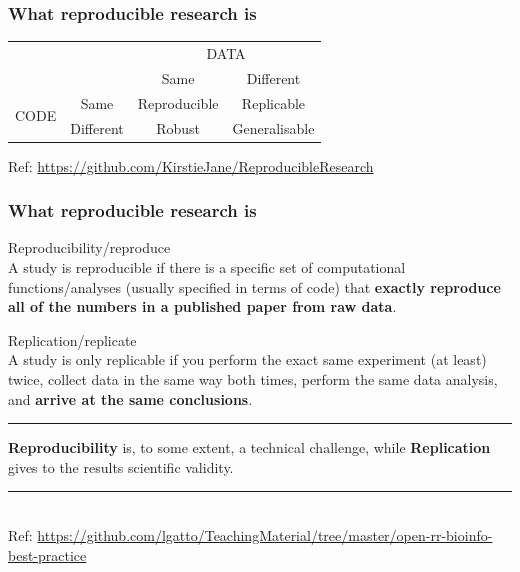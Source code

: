 \documentclass{beamer}
\begin{document}

\begin{frame}
\frametitle{What reproducible research is}
\begin{table}[]
\centering
\begin{tabular}{cccc}
                                           &                                & \multicolumn{2}{c}{DATA}                          \\ \cline{3-4}
                                           & \multicolumn{1}{c|}{}          & Same         & \multicolumn{1}{c|}{Different}     \\ \cline{2-4}
\multicolumn{1}{c|}{\multirow{2}{*}{CODE}} & \multicolumn{1}{c|}{Same}      & Reproducible & \multicolumn{1}{c|}{Replicable}    \\
\multicolumn{1}{c|}{}                      & \multicolumn{1}{c|}{Different} & Robust       & \multicolumn{1}{c|}{Generalisable} \\ \cline{2-4}
\end{tabular}
\end{table}
\vspace{3px}
\tiny Ref: {\url{https://github.com/KirstieJane/ReproducibleResearch}}
\end{frame}


\begin{frame}
\frametitle{What reproducible research is}

\Large{Reproducibility/reproduce}\\ \footnotesize A study is reproducible if there is a specific set of computational functions/analyses (usually specified in terms of code) that \textbf{exactly reproduce all of the numbers in a published paper from raw data}.

\Large{Replication/replicate}\\ \footnotesize A study is only replicable if you perform the exact same experiment (at least) twice, collect data in the same way both times, perform the same data analysis, and \textbf{arrive at the same conclusions}.
\rule{\textwidth}{0.05pt}
{\bf Reproducibility} is, to some extent, a technical challenge, while {\bf Replication} gives to the results scientific validity.
\rule{\textwidth}{0.05pt}\\
\vspace{3px}
\tiny Ref: {\url{https://github.com/lgatto/TeachingMaterial/tree/master/open-rr-bioinfo-best-practice}}
\end{frame}
\end{document}

